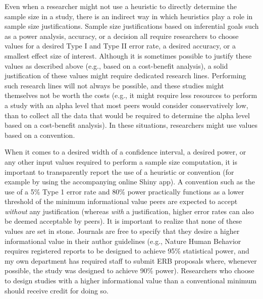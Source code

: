 \documentclass[
  oneside]{book}
\begin{document}
Even when a researcher might not use a heuristic to directly determine the sample size in a study, there is an indirect way in which heuristics play a role in sample size justifications. Sample size justifications based on inferential goals such as a power analysis, accuracy, or a decision all require researchers to choose values for a desired Type I and Type II error rate, a desired accuracy, or a smallest effect size of interest. Although it is sometimes possible to justify these values as described above (e.g., based on a cost-benefit analysis), a solid justification of these values might require dedicated research lines. Performing such research lines will not always be possible, and these studies might themselves not be worth the costs (e.g., it might require less resources to perform a study with an alpha level that most peers would consider conservatively low, than to collect all the data that would be required to determine the alpha level based on a cost-benefit analysis). In these situations, researchers might use values based on a convention.

When it comes to a desired width of a confidence interval, a desired power, or any other input values required to perform a sample size computation, it is important to transparently report the use of a heuristic or convention (for example by using the accompanying online Shiny app). A convention such as the use of a 5\% Type 1 error rate and 80\% power practically functions as a lower threshold of the minimum informational value peers are expected to accept \emph{without} any justification (whereas \emph{with} a justification, higher error rates can also be deemed acceptable by peers). It is important to realize that none of these values are set in stone. Journals are free to specify that they desire a higher informational value in their author guidelines (e.g., Nature Human Behavior requires registered reports to be designed to achieve 95\% statistical power, and my own department has required staff to submit ERB proposals where, whenever possible, the study was designed to achieve 90\% power). Researchers who choose to design studies with a higher informational value than a conventional minimum should receive credit for doing so.
\end{document}
